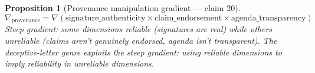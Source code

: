 \documentclass[11pt,a4paper]{article}
\newtheorem{proposition}[definition]{Proposition}
\begin{document}
\begin{proposition}[Provenance manipulation gradient --- claim 20]
\label{prop:prov_grad}
\[
  \nabla_{\text{provenance}} = \nabla\left(\text{signature\_authenticity}
    \times \text{claim\_endorsement} \times
    \text{agenda\_transparency}\right)
\]
Steep gradient: some dimensions reliable (signatures are real) while
others unreliable (claims aren't genuinely endorsed, agenda isn't
transparent). The deceptive-letter genre exploits the steep gradient:
using reliable dimensions to imply reliability in unreliable dimensions.
\end{proposition}
\end{document}

